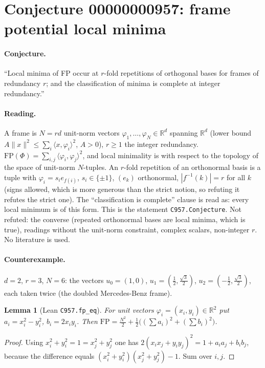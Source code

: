 \documentclass[11pt]{article}
\newtheorem{lemma}{Lemma}
\begin{document}
\section*{Conjecture 00000000957: frame potential local minima}

\paragraph{Conjecture.} ``Local minima of FP occur at $r$-fold repetitions of orthogonal bases for frames of redundancy $r$; and the classification of minima is complete at integer redundancy.''

\paragraph{Reading.} A frame is $N=rd$ unit-norm vectors $\varphi_1,\dots,\varphi_N\in\mathbb R^d$ spanning $\mathbb R^d$ (lower bound $A\|x\|^2\le\sum_i\langle x,\varphi_i\rangle^2$, $A>0$), $r\ge1$ the integer redundancy. $\mathrm{FP}(\Phi)=\sum_{i,j}\langle\varphi_i,\varphi_j\rangle^2$, and local minimality is with respect to the topology of the space of unit-norm $N$-tuples. An $r$-fold repetition of an orthonormal basis is a tuple with $\varphi_i=s_i e_{f(i)}$, $s_i\in\{\pm1\}$, $(e_k)$ orthonormal, $|f^{-1}(k)|=r$ for all $k$ (signs allowed, which is more generous than the strict notion, so refuting it refutes the strict one). The ``classification is complete'' clause is read as: every local minimum is of this form. This is the statement \texttt{C957.Conjecture}. Not refuted: the converse (repeated orthonormal bases are local minima, which is true), readings without the unit-norm constraint, complex scalars, non-integer $r$. No literature is used.

\paragraph{Counterexample.} $d=2$, $r=3$, $N=6$: the vectors $u_0=(1,0)$, $u_1=(\tfrac12,\tfrac{\sqrt3}2)$, $u_2=(-\tfrac12,\tfrac{\sqrt3}2)$, each taken twice (the doubled Mercedes-Benz frame).

\begin{lemma}[Lean \texttt{C957.fp\_eq}]
For unit vectors $\varphi_i=(x_i,y_i)\in\mathbb R^2$ put $a_i=x_i^2-y_i^2$, $b_i=2x_iy_i$. Then $\mathrm{FP}=\tfrac{N^2}{2}+\tfrac12\big((\sum a_i)^2+(\sum b_i)^2\big)$.
\end{lemma}
\begin{proof}
Using $x_i^2+y_i^2=1=x_j^2+y_j^2$ one has $2(x_ix_j+y_iy_j)^2=1+a_ia_j+b_ib_j$, because the difference equals $(x_i^2+y_i^2)(x_j^2+y_j^2)-1$. Sum over $i,j$.
\end{proof}
\end{document}
